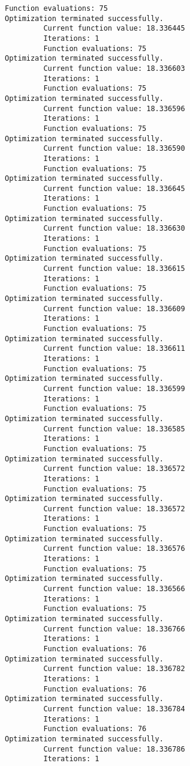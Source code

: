 \documentclass[11pt]{article}
\begin{document}
\begin{Verbatim}[commandchars=\\\{\}]
         Function evaluations: 75
Optimization terminated successfully.
         Current function value: 18.336445
         Iterations: 1
         Function evaluations: 75
Optimization terminated successfully.
         Current function value: 18.336603
         Iterations: 1
         Function evaluations: 75
Optimization terminated successfully.
         Current function value: 18.336596
         Iterations: 1
         Function evaluations: 75
Optimization terminated successfully.
         Current function value: 18.336590
         Iterations: 1
         Function evaluations: 75
Optimization terminated successfully.
         Current function value: 18.336645
         Iterations: 1
         Function evaluations: 75
Optimization terminated successfully.
         Current function value: 18.336630
         Iterations: 1
         Function evaluations: 75
Optimization terminated successfully.
         Current function value: 18.336615
         Iterations: 1
         Function evaluations: 75
Optimization terminated successfully.
         Current function value: 18.336609
         Iterations: 1
         Function evaluations: 75
Optimization terminated successfully.
         Current function value: 18.336611
         Iterations: 1
         Function evaluations: 75
Optimization terminated successfully.
         Current function value: 18.336599
         Iterations: 1
         Function evaluations: 75
Optimization terminated successfully.
         Current function value: 18.336585
         Iterations: 1
         Function evaluations: 75
Optimization terminated successfully.
         Current function value: 18.336572
         Iterations: 1
         Function evaluations: 75
Optimization terminated successfully.
         Current function value: 18.336572
         Iterations: 1
         Function evaluations: 75
Optimization terminated successfully.
         Current function value: 18.336576
         Iterations: 1
         Function evaluations: 75
Optimization terminated successfully.
         Current function value: 18.336566
         Iterations: 1
         Function evaluations: 75
Optimization terminated successfully.
         Current function value: 18.336766
         Iterations: 1
         Function evaluations: 76
Optimization terminated successfully.
         Current function value: 18.336782
         Iterations: 1
         Function evaluations: 76
Optimization terminated successfully.
         Current function value: 18.336784
         Iterations: 1
         Function evaluations: 76
Optimization terminated successfully.
         Current function value: 18.336786
         Iterations: 1

\end{Verbatim}
\end{document}
